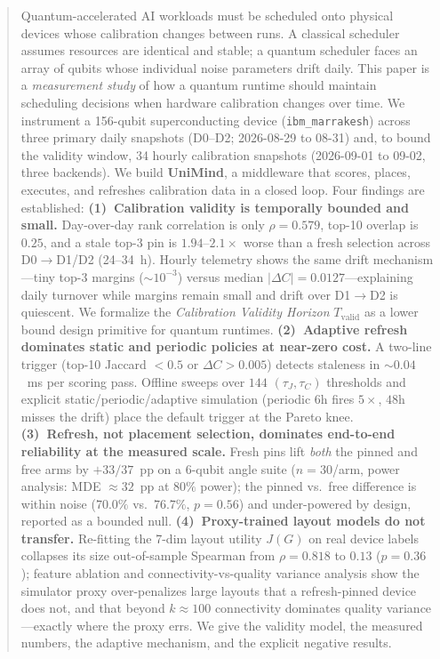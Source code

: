 \documentclass[journal,10pt,twocolumn]{IEEEtran}
\begin{document}
\begin{abstract}
Quantum-accelerated AI workloads must be scheduled onto physical devices whose calibration changes
between runs. A classical scheduler assumes resources are identical and stable; a quantum scheduler
faces an array of qubits whose individual noise parameters drift daily. This paper is a
\emph{measurement study} of how a quantum runtime should maintain scheduling decisions when hardware
calibration changes over time. We instrument a 156-qubit superconducting device
(\texttt{ibm\_marrakesh}) across three primary daily snapshots (D0--D2; 2026-08-29 to 08-31) and,
to bound the validity window, 34 hourly calibration snapshots (2026-09-01 to 09-02, three backends).
We build \textbf{UniMind}, a middleware that scores, places, executes, and refreshes calibration
data in a closed loop. Four findings are established:
\textbf{(1)~Calibration validity is temporally bounded and small.} Day-over-day rank correlation is only
$\rho{=}0.579$, top-10 overlap is $0.25$, and a stale top-3 pin is $1.94$--$2.1\times$ worse than a
fresh selection across D0$\to$D1/D2 (24--34~h). Hourly telemetry shows the same drift mechanism---tiny
top-3 margins ($\sim10^{-3}$) versus median $|\Delta C|=0.0127$---explaining daily turnover while
margins remain small and drift over D1$\to$D2 is quiescent.
We formalize the \emph{Calibration Validity Horizon}
$T_{\mathrm{valid}}$ as a lower bound design primitive for quantum runtimes.
\textbf{(2)~Adaptive refresh dominates static and periodic policies at near-zero cost.} A two-line
trigger (top-10 Jaccard $<0.5$ or $\Delta C{>}0.005$) detects staleness in $\sim0.04$~ms per
scoring pass. Offline sweeps over $144$ $(\tau_J,\tau_C)$ thresholds and explicit
static/periodic/adaptive simulation (periodic $6$h fires $5\times$, $48$h misses the drift)
place the default trigger at the Pareto knee.
\textbf{(3)~Refresh, not placement selection, dominates end-to-end reliability at the measured scale.}
Fresh pins lift \emph{both} the pinned and free arms by $+33/37$~pp on a 6-qubit angle suite
($n=30$/arm, power analysis: MDE $\approx32$~pp at $80\%$ power); the pinned vs.\ free difference
is within noise ($70.0\%$ vs.\ $76.7\%$, $p{=}0.56$) and under-powered by design, reported as a bounded
null.
\textbf{(4)~Proxy-trained layout models do not transfer.} Re-fitting the 7-dim layout utility $J(G)$
on real device labels collapses its size out-of-sample Spearman from $\rho{=}0.818$ to $0.13$
($p{=}0.36$); feature ablation and connectivity-vs-quality variance analysis show the simulator
proxy over-penalizes large layouts that a refresh-pinned device does not, and that beyond
$k\approx100$ connectivity dominates quality variance---exactly where the proxy errs.
We give the validity model, the measured numbers, the adaptive mechanism, and the explicit negative results.
\end{abstract}
\end{document}
